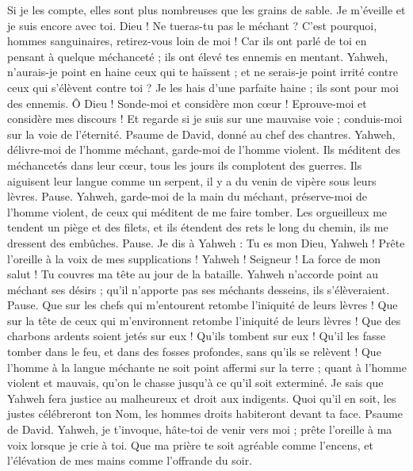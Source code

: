 \begin{multicols}{2}
Si je les compte, elles sont plus nombreuses que les grains de sable. Je m’éveille et je suis encore avec toi.
Dieu ! Ne tueras-tu pas le méchant ? C’est pourquoi, hommes sanguinaires, retirez-vous loin de moi !
Car ils ont parlé de toi en pensant à quelque méchanceté ; ils ont élevé tes ennemis en mentant.
Yahweh, n'aurais-je point en haine ceux qui te haïssent ; et ne serais-je point irrité contre ceux qui s'élèvent contre toi ?
Je les hais d'une parfaite haine ; ils sont pour moi des ennemis.
Ô Dieu ! Sonde-moi et considère mon cœur ! Eprouve-moi et considère mes discours !
Et regarde si je suis sur une mauvaise voie ; conduis-moi sur la voie de l’éternité.
\VerseOne{}Psaume de David, donné au chef des chantres. Yahweh, délivre-moi de l'homme méchant, garde-moi de l'homme violent.
Ils méditent des méchancetés dans leur cœur, tous les jours ils complotent des guerres.
Ils aiguisent leur langue comme un serpent, il y a du venin de vipère sous leurs lèvres. Pause.
Yahweh, garde-moi de la main du méchant, préserve-moi de l'homme violent, de ceux qui méditent de me faire tomber.
Les orgueilleux me tendent un piège et des filets, et ils étendent des rets le long du chemin, ils me dressent des embûches. Pause.
Je dis à Yahweh : Tu es mon Dieu, Yahweh ! Prête l'oreille à la voix de mes supplications !
Yahweh ! Seigneur ! La force de mon salut ! Tu couvres ma tête au jour de la bataille.
Yahweh n'accorde point au méchant ses désirs ; qu’il n’apporte pas ses méchants desseins, ils s'élèveraient. Pause.
Que sur les chefs qui m’entourent retombe l’iniquité de leurs lèvres !
Que sur la tête de ceux qui m’environnent retombe l’iniquité de leurs lèvres !
Que des charbons ardents soient jetés sur eux ! Qu’ils tombent sur eux ! Qu'il les fasse tomber dans le feu, et dans des fosses profondes, sans qu'ils se relèvent !
Que l'homme à la langue méchante ne soit point affermi sur la terre ; quant à l'homme violent et mauvais, qu'on le chasse jusqu’à ce qu'il soit exterminé.
Je sais que Yahweh fera justice au malheureux et droit aux indigents.
Quoi qu'il en soit, les justes célébreront ton Nom, les hommes droits habiteront devant ta face.
\VerseOne{}Psaume de David. Yahweh, je t'invoque, hâte-toi de venir vers moi ; prête l'oreille à ma voix lorsque je crie à toi.
Que ma prière te soit agréable comme l’encens, et l'élévation de mes mains comme l’offrande du soir.

\end{multicols}

